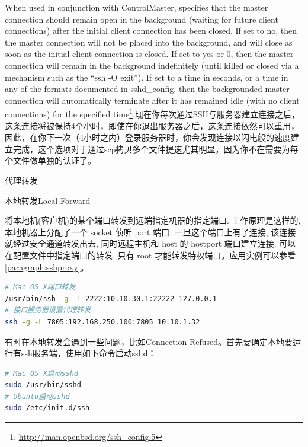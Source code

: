 \documentclass[12pt]{book}
\makeatletter
\numberwithin{dummy}{section}
\theoremstyle{ocrenumbox}
\theoremstyle{blacknumex}
\theoremstyle{blacknumbox}
\theoremstyle{ocrenum}
\renewcommand{\subsection}{\@startsection {subsection}{2}{\z@}
	{-3ex \@plus -0.1ex \@minus -.4ex}
	{0.5ex \@plus.2ex }
	{\normalfont\sffamily\bfseries}}
\renewcommand\paragraph{\@startsection{paragraph}{4}{\z@}
	{-2ex \@plus-.2ex \@minus .2ex}
	{.1ex}
	{\normalfont\small\sffamily\bfseries}}
\makeatother
\begin{document}
When used in conjunction with ControlMaster, specifies that the master connection should remain open in the background (waiting for future client connections) after the initial client connection has been closed. If set to no, then the master connection will not be placed into the background, and will close as soon as the initial client connection is closed. If set to yes or 0, then the master connection will remain in the background indefinitely (until killed or closed via a mechanism such as the “ssh -O exit”). If set to a time in seconds, or a time in any of the formats documented in sshd\_config, then the backgrounded master connection will automatically terminate after it has remained idle (with no client connections) for the specified time\footnote{\url{http://man.openbsd.org/ssh_config.5}}.现在你每次通过SSH与服务器建立连接之后，这条连接将被保持4个小时，即使在你退出服务器之后，这条连接依然可以重用，因此，在你下一次（4小时之内）登录服务器时，你会发现连接以闪电般的速度建立完成，这个选项对于通过scp拷贝多个文件提速尤其明显，因为你不在需要为每个文件做单独的认证了。

\subsection{代理转发}

\paragraph{本地转发Local Forward}

将本地机(客户机)的某个端口转发到远端指定机器的指定端口. 工作原理是这样的, 本地机器上分配了一个 socket 侦听 port 端口, 一旦这个端口上有了连接, 该连接就经过安全通道转发出去, 同时远程主机和 host 的 hostport 端口建立连接. 可以在配置文件中指定端口的转发. 只有 root 才能转发特权端口。应用实例可以参看\ref{paragraph:sshproxy}。

\begin{lstlisting}[language=Bash]
# Mac OS X端口转发
/usr/bin/ssh -g -L 2222:10.10.30.1:22222 127.0.0.1
# 接口服务器设置代理转发
ssh -g -L 7805:192.168.250.100:7805 10.10.1.32
\end{lstlisting}

有时在本地转发会遇到一些问题，比如Connection Refused。首先要确定本地要运行有ssh服务端，使用如下命令启动sshd：

\begin{lstlisting}[language=Bash]
# Mac OS X启动sshd
sudo /usr/bin/sshd
# Ubuntu启动sshd
sudo /etc/init.d/ssh
\end{lstlisting}
\end{document}
